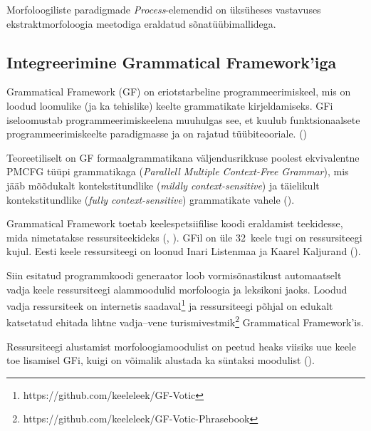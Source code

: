 \documentclass[12pt,a4paper]{article}
\begin{document}
Morfoloogiliste paradigmade \textit{Process}-elemendid on üks\-üheses vastavuses ekstrakt\-morfoloogia meetodiga eraldatud sõnatüübi\-mallidega.




\FloatBarrier
\subsection{Integreerimine Grammatical Framework'iga}
\label{sec:gf}

Grammatical Framework (GF) on eriotstarbeline programmeerimis\-keel, mis on loodud loomulike (ja ka tehislike) keelte grammatikate kirjeldamiseks. GFi iseloomustab programmeerimis\-keelena muuhulgas see, et kuulub funktsionaalsete programmeerimis\-keelte paradigmasse ja on rajatud tüübiteooriale. (\cite[\RN{7}]{ranta_grammatical_2011}) %

Teoreetiliselt on GF formaal\-grammatikana väljendus\-rikkuse poolest ekvivalentne PMCFG tüüpi grammatikaga (\textit{Parallell Multiple Context-Free Grammar}), mis jääb mõõdukalt konteksti\-tundlike (\textit{mildly context-sensitive}) ja täielikult konteksti\-tundlike (\textit{fully context-sensitive}) grammatikate vahele (\cite[10]{ranta_grammatical_2011}).

Grammatical Framework toetab keele\-spetsiifilise koodi eraldamist teekidesse, mida nimetatakse ressursi\-teekideks (\cite{ranta_grammars_2008}, \cite[97]{ranta_grammatical_2011}). GFil on üle 32~keele tugi on ressursi\-teegi kujul. Eesti keele ressursi\-teegi on loonud Inari Listenmaa ja Kaarel Kaljurand (\citeyear{listenmaa_computational_2014}). %

Siin esitatud programm\-koodi generaator loob vormisõnastikust automaatselt vadja keele ressursi\-teegi alam\-moodulid morfoloogia ja leksikoni jaoks. Loodud vadja ressursi\-teek on internetis saadaval\footnote{https://github.com/keeleleek/GF-Votic} ja ressursi\-teegi põhjal on edukalt katsetatud ehitada lihtne vadja--vene turismi\-vestmik\footnote{https://github.com/keeleleek/GF-Votic-Phrasebook} Grammatical Framework'is.

Ressursi\-teegi alustamist morfoloogia\-moodulist on peetud heaks viisiks uue keele toe lisamisel GFi, kuigi on võimalik alustada ka süntaksi moodulist (\cite[209]{ranta_grammatical_2011}). %
\end{document}
